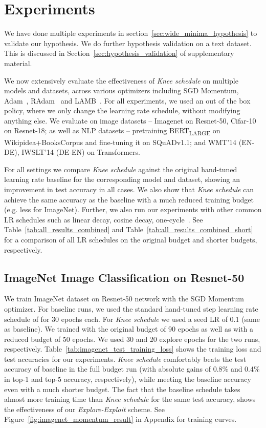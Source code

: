 \documentclass{article} \usepackage{iclr2021_conference,times}
\newcommand{\lrschedule}{\textit{Knee schedule}}
\begin{document}
 \vspace{-6pt}
\section{Experiments}
\label{sec:experiments}

We have done multiple experiments in section~\ref{sec:wide_minima_hypothesis} to validate our hypothesis. We do further hypothesis validation on a text dataset. This is discussed in Section~\ref{sec:hypothesis_validation} of supplementary material.

We now extensively evaluate the effectiveness of \lrschedule{} on multiple models and datasets, across various optimizers including SGD Momentum, Adam~\citep{adam_kingma2014adam}, RAdam~\citep{liu2019variance_radam} and LAMB~\citep{bert76lamb}. For all experiments, we used an out of the box policy, where we only change the learning rate schedule, without modifying anything else. We evaluate on image datasets -- Imagenet on Resnet-50, Cifar-10 on Resnet-18; as well as NLP datasets -- pretraining BERT\textsubscript{LARGE} on Wikipidea+BooksCorpus and fine-tuning it on SQuADv1.1; and WMT'14 (EN-DE), IWSLT'14 (DE-EN) on Transformers.

For all settings we compare \lrschedule{} against the original hand-tuned learning rate baseline for the corresponding model and dataset, showing an improvement in test accuracy in all cases. We also show that \lrschedule{} can achieve the same accuracy as the baseline with a much reduced training budget (e.g.  less for ImageNet). Further, we also run our experiments with other common LR schedules such as linear decay, cosine decay, one-cycle~\citep{smith2018disciplined_onecycle}. See Table~\ref{tab:all_results_combined} and Table~\ref{tab:all_results_combined_short} for a comparison of all LR schedules on the original budget and shorter budgets, respectively.

\subsection{ImageNet Image Classification on Resnet-50}

We train ImageNet dataset \citep{imagenet-dataset} on Resnet-50 network \citep{resnet_he_2016} with the SGD Momentum optimizer. For baseline runs, we used the standard hand-tuned step learning rate schedule of  for 30 epochs each. For \lrschedule{} we used a seed LR of 0.1 (same as baseline). We trained with the original budget of 90 epochs as well as with a reduced budget of 50 epochs. We used 30 and 20 explore epochs for the two runs, respectively. Table~\ref{tab:imagenet_test_training_loss} shows the training loss and test accuracies for our experiments. \lrschedule{} comfortably beats the test accuracy of baseline in the full budget run
(with absolute gains of 0.8\% and 0.4\% in top-1 and top-5 accuracy, respectively), while meeting the baseline accuracy even with a much shorter budget. The fact that the baseline schedule takes almost  more training time than \lrschedule{} for the same test accuracy, shows the effectiveness of our \textit{Explore-Exploit} scheme.
See Figure~\ref{fig:imagenet_momentum_result} in Appendix for training curves.
\end{document}
